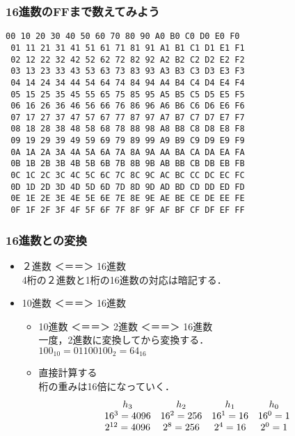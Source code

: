 \documentclass{beamer}                 %
\begin{document}
\begin{frame}[fragile]
  \frametitle{16進数のFFまで数えてみよう}
  \begin{lstlisting}[basicstyle={\ttfamily},frame=none]
 00 10 20 30 40 50 60 70 80 90 A0 B0 C0 D0 E0 F0
 01 11 21 31 41 51 61 71 81 91 A1 B1 C1 D1 E1 F1
 02 12 22 32 42 52 62 72 82 92 A2 B2 C2 D2 E2 F2
 03 13 23 33 43 53 63 73 83 93 A3 B3 C3 D3 E3 F3
 04 14 24 34 44 54 64 74 84 94 A4 B4 C4 D4 E4 F4
 05 15 25 35 45 55 65 75 85 95 A5 B5 C5 D5 E5 F5
 06 16 26 36 46 56 66 76 86 96 A6 B6 C6 D6 E6 F6
 07 17 27 37 47 57 67 77 87 97 A7 B7 C7 D7 E7 F7
 08 18 28 38 48 58 68 78 88 98 A8 B8 C8 D8 E8 F8
 09 19 29 39 49 59 69 79 89 99 A9 B9 C9 D9 E9 F9
 0A 1A 2A 3A 4A 5A 6A 7A 8A 9A AA BA CA DA EA FA
 0B 1B 2B 3B 4B 5B 6B 7B 8B 9B AB BB CB DB EB FB
 0C 1C 2C 3C 4C 5C 6C 7C 8C 9C AC BC CC DC EC FC
 0D 1D 2D 3D 4D 5D 6D 7D 8D 9D AD BD CD DD ED FD
 0E 1E 2E 3E 4E 5E 6E 7E 8E 9E AE BE CE DE EE FE
 0F 1F 2F 3F 4F 5F 6F 7F 8F 9F AF BF CF DF EF FF
  \end{lstlisting}

\end{frame}

\begin{frame}
  \frametitle{16進数との変換}

  \begin{itemize}
  \item ２進数 ＜＝＝＞ 16進数 \\
    4桁の２進数と1桁の16進数の対応は暗記する．
  \item 10進数 ＜＝＝＞ 16進数 \\
    \begin{itemize}
    \item 10進数 ＜＝＝＞ 2進数 ＜＝＝＞ 16進数 \\
      一度，2進数に変換してから変換する．\\
      $100_{10} = 0110 0100_2 = 64_{16}$
    \item 直接計算する \\
      桁の重みは16倍になっていく．
      \[
        \begin{array}{c c c c c }
          h_3     & h_2     & h_1     & h_0     \\
          16^3 = 4096 & 16^2 = 256 & 16^1 = 16 & 16^0 = 1 \\
          2^{12} = 4096 & 2^8 = 256 & 2^4 = 16 & 2^0 = 1 \\
        \end{array}
        \]
    \end{itemize}
  \end{itemize}
\end{frame}
\end{document}
